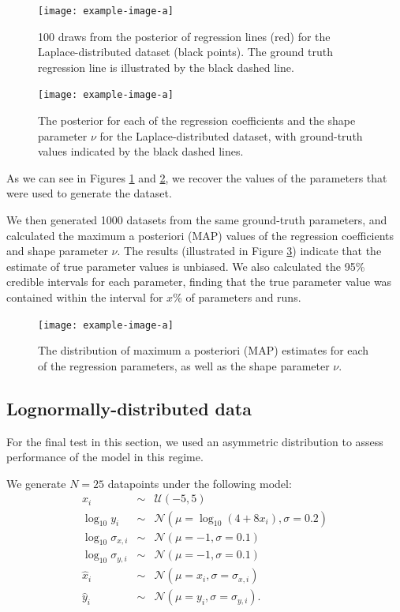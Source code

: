 \documentclass[fleqn,usenatbib]{mnras}
\begin{document}
\begin{figure}
    \texttt{[image: example-image-a]}
    \caption{{\color{red} 100} draws from the posterior of regression lines
    (red) for the Laplace-distributed dataset (black points). The ground
    truth regression line is illustrated by the black dashed line.}
    \label{fig:results.laplace.regression}
\end{figure}

\begin{figure}
    \texttt{[image: example-image-a]}
    \caption{The posterior for each of the regression coefficients and the shape
    parameter $\nu$ for the Laplace-distributed dataset, with ground-truth
    values indicated by the black dashed lines.}
    \label{fig:results.laplace.corner}
\end{figure}

As we can see in Figures \ref{fig:results.laplace.regression} and
\ref{fig:results.laplace.corner}, we recover the values of the parameters that were
used to generate the dataset.

We then generated 1000 datasets from the same ground-truth parameters, and
calculated the maximum a posteriori (MAP) values of the regression coefficients
and shape parameter $\nu$. The results (illustrated in Figure
\ref{fig:results.laplace.map}) indicate that the estimate of true parameter values is
unbiased.{
\color{red} We also calculated the 95\% credible intervals for each parameter,
finding that the true parameter value was contained within the interval for
$x$\% of parameters and runs.
}

\begin{figure}
    \texttt{[image: example-image-a]}
    \caption{The distribution of maximum a posteriori (MAP) estimates for each
    of the regression parameters, as well as the shape parameter $\nu$.}
    \label{fig:results.laplace.map}
\end{figure}


\subsection{Lognormally-distributed data}
\label{sec:results.lognormal}

For the final test in this section, we used an asymmetric distribution to assess
performance of the model in this regime.

We generate $N = 25$ datapoints under the following model:
\begin{eqnarray}
    x_i &\sim& \mathcal U (-5, 5) \\
    \log_{10} y_i &\sim& \mathcal N (\mu = \log_{10} (4 + 8 x_i), \sigma = 0.2) \\
    \log_{10} \sigma_{x, i} &\sim& \mathcal N (\mu = -1, \sigma = 0.1) \\
    \log_{10} \sigma_{y, i} &\sim& \mathcal N (\mu = -1, \sigma = 0.1) \\
    \hat{x}_i &\sim& \mathcal N (\mu = x_i, \sigma = \sigma_{x, i}) \\
    \hat{y}_i &\sim& \mathcal N (\mu = y_i, \sigma = \sigma_{y, i}).
\end{eqnarray}
\end{document}
